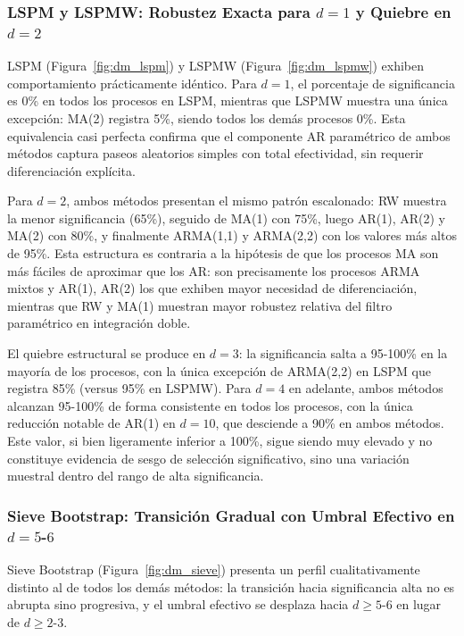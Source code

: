 \subsubsection{\texorpdfstring{LSPM y LSPMW: Robustez Exacta para $d = 1$ y Quiebre en $d = 2$}{LSPM y LSPMW: Robustez Exacta para d = 1 y Quiebre en d = 2}}

LSPM (Figura~\ref{fig:dm_lspm}) y LSPMW (Figura~\ref{fig:dm_lspmw}) exhiben comportamiento prácticamente idéntico. Para $d = 1$, el porcentaje de significancia es 0\% en todos los procesos en LSPM, mientras que LSPMW muestra una única excepción: MA(2) registra 5\%, siendo todos los demás procesos 0\%. Esta equivalencia casi perfecta confirma que el componente AR paramétrico de ambos métodos captura paseos aleatorios simples con total efectividad, sin requerir diferenciación explícita.

Para $d = 2$, ambos métodos presentan el mismo patrón escalonado: RW muestra la menor significancia (65\%), seguido de MA(1) con 75\%, luego AR(1), AR(2) y MA(2) con 80\%, y finalmente ARMA(1,1) y ARMA(2,2) con los valores más altos de 95\%. Esta estructura es contraria a la hipótesis de que los procesos MA son más fáciles de aproximar que los AR: son precisamente los procesos ARMA mixtos y AR(1), AR(2) los que exhiben mayor necesidad de diferenciación, mientras que RW y MA(1) muestran mayor robustez relativa del filtro paramétrico en integración doble.

El quiebre estructural se produce en $d = 3$: la significancia salta a 95-100\% en la mayoría de los procesos, con la única excepción de ARMA(2,2) en LSPM que registra 85\% (versus 95\% en LSPMW). Para $d = 4$ en adelante, ambos métodos alcanzan 95-100\% de forma consistente en todos los procesos, con la única reducción notable de AR(1) en $d = 10$, que desciende a 90\% en ambos métodos. Este valor, si bien ligeramente inferior a 100\%, sigue siendo muy elevado y no constituye evidencia de sesgo de selección significativo, sino una variación muestral dentro del rango de alta significancia.

\subsubsection{\texorpdfstring{Sieve Bootstrap: Transición Gradual con Umbral Efectivo en $d = 5$-$6$}{Sieve Bootstrap: Transición Gradual con Umbral Efectivo en d = 5-6}}

Sieve Bootstrap (Figura~\ref{fig:dm_sieve}) presenta un perfil cualitativamente distinto al de todos los demás métodos: la transición hacia significancia alta no es abrupta sino progresiva, y el umbral efectivo se desplaza hacia $d \geq 5$-$6$ en lugar de $d \geq 2$-$3$.

